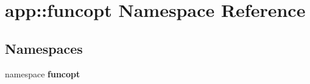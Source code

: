 \section{app::funcopt Namespace Reference}
\label{namespaceapp_1_1funcopt}


\subsection*{Namespaces}
\begin{CompactItemize}
\item 
namespace {\bf funcopt}
\end{CompactItemize}
